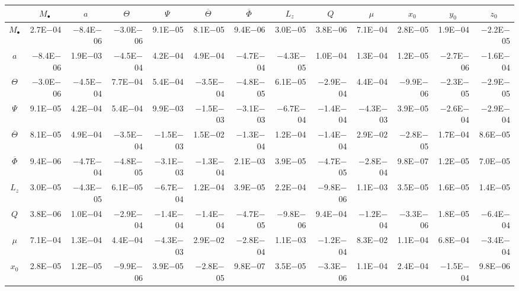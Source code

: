 \begin{sidewaystable}[htbp]\scriptsize
\centering
\begin{tabular}{crrrrrrrrrrrr}
\toprule
 & \multicolumn{1}{c}{$M_\bullet$} & \multicolumn{1}{c}{$a$} & \multicolumn{1}{c}{$\Theta$} & \multicolumn{1}{c}{$\Psi$} & \multicolumn{1}{c}{$\overline{\Theta}$} & \multicolumn{1}{c}{$\overline{\Phi}$} & \multicolumn{1}{c}{$L_z$} & \multicolumn{1}{c}{$Q$} & \multicolumn{1}{c}{$\mu$} & \multicolumn{1}{c}{$x_0$} & \multicolumn{1}{c}{$y_0$} & \multicolumn{1}{c}{$z_0$} \\ \midrule 
$M_\bullet$ & 2.7E$-$04 & $-$8.4E$-$06 & $-$3.0E$-$06 & 9.1E$-$05 & 8.1E$-$05 & 9.4E$-$06 & 3.0E$-$05 & 3.8E$-$06 & 7.1E$-$04 & 2.8E$-$05 & 1.9E$-$04 & $-$2.2E$-$05 \\
$a$ & $-$8.4E$-$06 & 1.9E$-$03 & $-$4.5E$-$04 & 4.2E$-$04 & 4.9E$-$04 & $-$4.7E$-$04 & $-$4.3E$-$05 & 1.0E$-$04 & 1.3E$-$04 & 1.2E$-$05 & $-$2.7E$-$06 & $-$1.6E$-$04 \\
$\Theta$ & $-$3.0E$-$06 & $-$4.5E$-$04 & 7.7E$-$04 & 5.4E$-$04 & $-$3.5E$-$04 & $-$4.8E$-$05 & 6.1E$-$05 & $-$2.9E$-$04 & 4.4E$-$04 & $-$9.9E$-$06 & $-$2.3E$-$05 & $-$2.9E$-$05 \\
$\Psi$ & 9.1E$-$05 & 4.2E$-$04 & 5.4E$-$04 & 9.9E$-$03 & $-$1.5E$-$03 & $-$3.1E$-$03 & $-$6.7E$-$04 & $-$1.4E$-$04 & $-$4.3E$-$03 & 3.9E$-$05 & $-$2.6E$-$04 & $-$2.9E$-$04 \\
$\overline{\Theta}$ & 8.1E$-$05 & 4.9E$-$04 & $-$3.5E$-$04 & $-$1.5E$-$03 & 1.5E$-$02 & $-$1.3E$-$04 & 1.2E$-$04 & $-$1.4E$-$04 & 2.9E$-$02 & $-$2.8E$-$05 & 1.7E$-$04 & 8.6E$-$05 \\
$\overline{\Phi}$ & 9.4E$-$06 & $-$4.7E$-$04 & $-$4.8E$-$05 & $-$3.1E$-$03 & $-$1.3E$-$04 & 2.1E$-$03 & 3.9E$-$05 & $-$4.7E$-$05 & $-$2.8E$-$04 & 9.8E$-$07 & 1.2E$-$05 & 7.0E$-$05 \\
$L_z$ & 3.0E$-$05 & $-$4.3E$-$05 & 6.1E$-$05 & $-$6.7E$-$04 & 1.2E$-$04 & 3.9E$-$05 & 2.2E$-$04 & $-$9.8E$-$06 & 1.1E$-$03 & 3.5E$-$05 & 1.6E$-$05 & 1.4E$-$05 \\
$Q$ & 3.8E$-$06 & 1.0E$-$04 & $-$2.9E$-$04 & $-$1.4E$-$04 & $-$1.4E$-$04 & $-$4.7E$-$05 & $-$9.8E$-$06 & 9.4E$-$04 & $-$1.2E$-$04 & $-$3.3E$-$06 & 1.8E$-$05 & $-$6.4E$-$04 \\
$\mu$ & 7.1E$-$04 & 1.3E$-$04 & 4.4E$-$04 & $-$4.3E$-$03 & 2.9E$-$02 & $-$2.8E$-$04 & 1.1E$-$03 & $-$1.2E$-$04 & 8.3E$-$02 & 1.1E$-$04 & 6.8E$-$04 & $-$3.4E$-$04 \\
$x_0$ & 2.8E$-$05 & 1.2E$-$05 & $-$9.9E$-$06 & 3.9E$-$05 & $-$2.8E$-$05 & 9.8E$-$07 & 3.5E$-$05 & $-$3.3E$-$06 & 1.1E$-$04 & 2.4E$-$04 & $-$1.5E$-$04 & 9.8E$-$06 \\

\end{tabular}
\end{sidewaystable}
